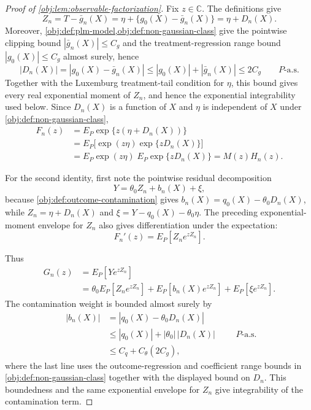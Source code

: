 \begin{proof}[Proof of \cref{obj:lem:observable-factorization}]
Fix \(z\in\mathbb C\).  The definitions give
\[
Z_n=T-\bar g_n(X)=\eta+\{g_0(X)-\bar g_n(X)\}=\eta+D_n(X).
\]
Moreover, \cref{obj:def:plm-model,obj:def:non-gaussian-class} give the pointwise clipping bound \(|\bar g_n(X)|\le C_g\) and the treatment-regression range bound \(|g_0(X)|\le C_g\) almost surely, hence
\[
 |D_n(X)|=|g_0(X)-\bar g_n(X)|
 \le |g_0(X)|+|\bar g_n(X)|
 \le 2C_g
 \qquad P\text{-a.s.}
\]
Together with the Luxemburg treatment-tail condition for \(\eta\), this bound gives every real exponential moment of \(Z_n\), and hence the exponential integrability used below. %
Since \(D_n(X)\) is a function of \(X\) and \(\eta\) is independent of \(X\) under \cref{obj:def:non-gaussian-class},
\[
\begin{aligned}
F_n(z)
&=E_P\exp\{z(\eta+D_n(X))\}  \\
&=E_P\bigl[\exp(z\eta)\exp\{zD_n(X)\}\bigr] \\
&=E_P\exp(z\eta)\;E_P\exp\{zD_n(X)\}
=M(z)H_n(z).
\end{aligned}
\]

For the second identity, first note the pointwise residual decomposition
\[
Y=\theta_0 Z_n+b_n(X)+\xi,
\]
because \cref{obj:def:outcome-contamination} gives \(b_n(X)=q_0(X)-\theta_0D_n(X)\), while \(Z_n=\eta+D_n(X)\) and \(\xi=Y-q_0(X)-\theta_0\eta\).  The preceding exponential-moment envelope for \(Z_n\) also gives differentiation under the expectation:
\[
F_n'(z)
=
E_P\!\left[Z_n e^{zZ_n}\right].
\]

Thus
\[
\begin{aligned}
G_n(z)
&=E_P\!\left[Y e^{zZ_n}\right] \\
&=\theta_0 E_P\!\left[Z_ne^{zZ_n}\right]
  +E_P\!\left[b_n(X)e^{zZ_n}\right]
  +E_P\!\left[\xi e^{zZ_n}\right].
\end{aligned}
\]
The contamination weight is bounded almost surely by
\[
\begin{aligned}
 |b_n(X)|
 &=|q_0(X)-\theta_0D_n(X)| \\
 &\le |q_0(X)|+|\theta_0|\,|D_n(X)| \\
 &\le C_q+C_{\theta}(2C_g),
\end{aligned}
\qquad P\text{-a.s.}
\]
where the last line uses the outcome-regression and coefficient range bounds in \cref{obj:def:non-gaussian-class} together with the displayed bound on \(D_n\).  This boundedness and the same exponential envelope for \(Z_n\) give integrability of the contamination term. %


\end{proof}
